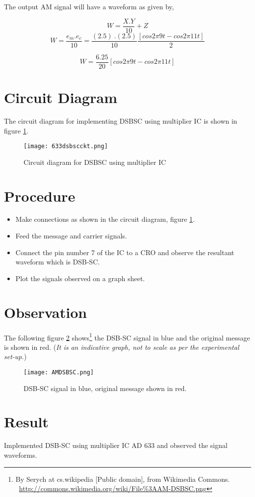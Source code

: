 The output AM signal will have a waveform as given by,

\begin{equation}
W=\frac{X.Y}{10}+Z
\end{equation}
\begin{equation}
W=\frac{e_m.e_c}{10}=\frac{(2.5) \ .(2.5)}{10}\frac{[cos 2\pi9t-cos 2\pi11t]}{2}
\end{equation}

\begin{equation}
W=\frac{6.25}{20}[cos 2\pi9t-cos 2\pi11t]
\end{equation} 

\section*{Circuit Diagram}
The circuit diagram for implementing DSBSC using multiplier IC is shown in figure \ref{DSBSCckt}.
\begin{figure}[h]
\begin{center}
\texttt{[image: 633dsbscckt.png]}
\caption{Circuit diagram for DSBSC using multiplier IC}
\label{DSBSCckt}
\end{center}

\end{figure}

\section*{Procedure}
\begin{itemize}
\item
Make connections as shown in the circuit diagram, figure \ref{DSBSCckt}.
\item
Feed the message and carrier signals.
\item
Connect the pin number 7 of the IC to a CRO and observe the resultant waveform which is DSB-SC.
\item

Plot the signals observed on a graph sheet.
\end{itemize}
\section*{Observation}

The following figure \ref{DSBSC} shows\footnote{By Serych at cs.wikipedia [Public domain], from Wikimedia Commons.  \ \url{http://commons.wikimedia.org/wiki/File\%3AAM-DSBSC.png}} the DSB-SC signal in blue and the original message is shown in red. (\emph{It is an indicative graph, not to scale as per the experimental set-up.})
\begin{figure}[h]
\begin{center}
\texttt{[image: AMDSBSC.png]}
\caption{DSB-SC signal in blue, original message shown in red.}
\label{DSBSC}
\end{center}

\end{figure}


\section*{Result}
Implemented DSB-SC using multiplier IC AD 633 and observed the signal waveforms.